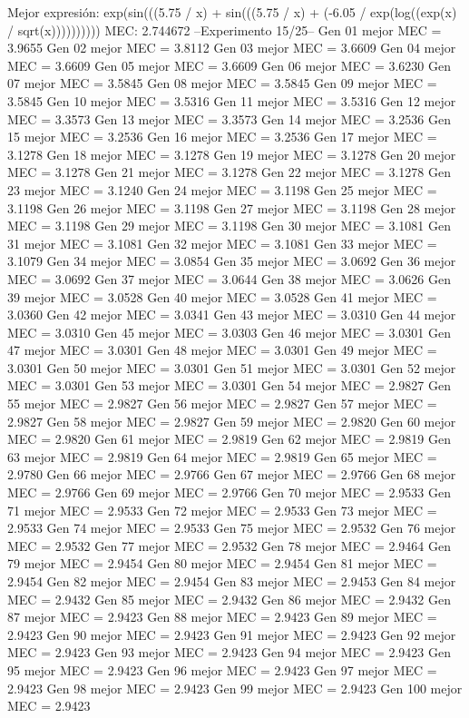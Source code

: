 Mejor expresión: exp(sin(((5.75 / x) + sin(((5.75 / x) + (-6.05 / exp(log((exp(x) / sqrt(x))))))))))
MEC: 2.744672
--Experimento 
 15/25--
Gen 01 mejor MEC = 3.9655
Gen 02 mejor MEC = 3.8112
Gen 03 mejor MEC = 3.6609
Gen 04 mejor MEC = 3.6609
Gen 05 mejor MEC = 3.6609
Gen 06 mejor MEC = 3.6230
Gen 07 mejor MEC = 3.5845
Gen 08 mejor MEC = 3.5845
Gen 09 mejor MEC = 3.5845
Gen 10 mejor MEC = 3.5316
Gen 11 mejor MEC = 3.5316
Gen 12 mejor MEC = 3.3573
Gen 13 mejor MEC = 3.3573
Gen 14 mejor MEC = 3.2536
Gen 15 mejor MEC = 3.2536
Gen 16 mejor MEC = 3.2536
Gen 17 mejor MEC = 3.1278
Gen 18 mejor MEC = 3.1278
Gen 19 mejor MEC = 3.1278
Gen 20 mejor MEC = 3.1278
Gen 21 mejor MEC = 3.1278
Gen 22 mejor MEC = 3.1278
Gen 23 mejor MEC = 3.1240
Gen 24 mejor MEC = 3.1198
Gen 25 mejor MEC = 3.1198
Gen 26 mejor MEC = 3.1198
Gen 27 mejor MEC = 3.1198
Gen 28 mejor MEC = 3.1198
Gen 29 mejor MEC = 3.1198
Gen 30 mejor MEC = 3.1081
Gen 31 mejor MEC = 3.1081
Gen 32 mejor MEC = 3.1081
Gen 33 mejor MEC = 3.1079
Gen 34 mejor MEC = 3.0854
Gen 35 mejor MEC = 3.0692
Gen 36 mejor MEC = 3.0692
Gen 37 mejor MEC = 3.0644
Gen 38 mejor MEC = 3.0626
Gen 39 mejor MEC = 3.0528
Gen 40 mejor MEC = 3.0528
Gen 41 mejor MEC = 3.0360
Gen 42 mejor MEC = 3.0341
Gen 43 mejor MEC = 3.0310
Gen 44 mejor MEC = 3.0310
Gen 45 mejor MEC = 3.0303
Gen 46 mejor MEC = 3.0301
Gen 47 mejor MEC = 3.0301
Gen 48 mejor MEC = 3.0301
Gen 49 mejor MEC = 3.0301
Gen 50 mejor MEC = 3.0301
Gen 51 mejor MEC = 3.0301
Gen 52 mejor MEC = 3.0301
Gen 53 mejor MEC = 3.0301
Gen 54 mejor MEC = 2.9827
Gen 55 mejor MEC = 2.9827
Gen 56 mejor MEC = 2.9827
Gen 57 mejor MEC = 2.9827
Gen 58 mejor MEC = 2.9827
Gen 59 mejor MEC = 2.9820
Gen 60 mejor MEC = 2.9820
Gen 61 mejor MEC = 2.9819
Gen 62 mejor MEC = 2.9819
Gen 63 mejor MEC = 2.9819
Gen 64 mejor MEC = 2.9819
Gen 65 mejor MEC = 2.9780
Gen 66 mejor MEC = 2.9766
Gen 67 mejor MEC = 2.9766
Gen 68 mejor MEC = 2.9766
Gen 69 mejor MEC = 2.9766
Gen 70 mejor MEC = 2.9533
Gen 71 mejor MEC = 2.9533
Gen 72 mejor MEC = 2.9533
Gen 73 mejor MEC = 2.9533
Gen 74 mejor MEC = 2.9533
Gen 75 mejor MEC = 2.9532
Gen 76 mejor MEC = 2.9532
Gen 77 mejor MEC = 2.9532
Gen 78 mejor MEC = 2.9464
Gen 79 mejor MEC = 2.9454
Gen 80 mejor MEC = 2.9454
Gen 81 mejor MEC = 2.9454
Gen 82 mejor MEC = 2.9454
Gen 83 mejor MEC = 2.9453
Gen 84 mejor MEC = 2.9432
Gen 85 mejor MEC = 2.9432
Gen 86 mejor MEC = 2.9432
Gen 87 mejor MEC = 2.9423
Gen 88 mejor MEC = 2.9423
Gen 89 mejor MEC = 2.9423
Gen 90 mejor MEC = 2.9423
Gen 91 mejor MEC = 2.9423
Gen 92 mejor MEC = 2.9423
Gen 93 mejor MEC = 2.9423
Gen 94 mejor MEC = 2.9423
Gen 95 mejor MEC = 2.9423
Gen 96 mejor MEC = 2.9423
Gen 97 mejor MEC = 2.9423
Gen 98 mejor MEC = 2.9423
Gen 99 mejor MEC = 2.9423
Gen 100 mejor MEC = 2.9423

